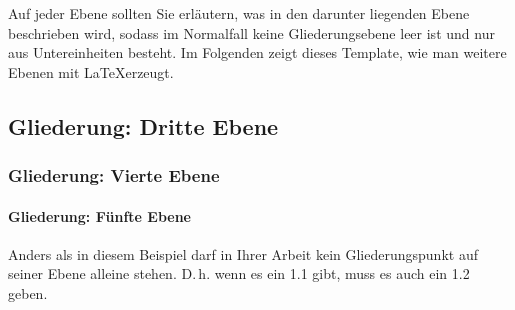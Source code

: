 Auf jeder Ebene sollten Sie erläutern, was in den darunter liegenden Ebene beschrieben wird, sodass im Normalfall keine Gliederungsebene leer ist und nur aus Untereinheiten besteht. Im Folgenden zeigt dieses Template, wie man weitere Ebenen mit \LaTeX erzeugt.

\subsection{Gliederung: Dritte Ebene}

\label{Gliederung:EbeneDrei}


\subsubsection{Gliederung: Vierte Ebene}

\paragraph{Gliederung: Fünfte Ebene} Anders als in diesem Beispiel darf in Ihrer Arbeit kein Gliederungspunkt auf seiner Ebene alleine stehen. D.\,h. wenn es ein 1.1 gibt, muss es auch ein 1.2 geben.

